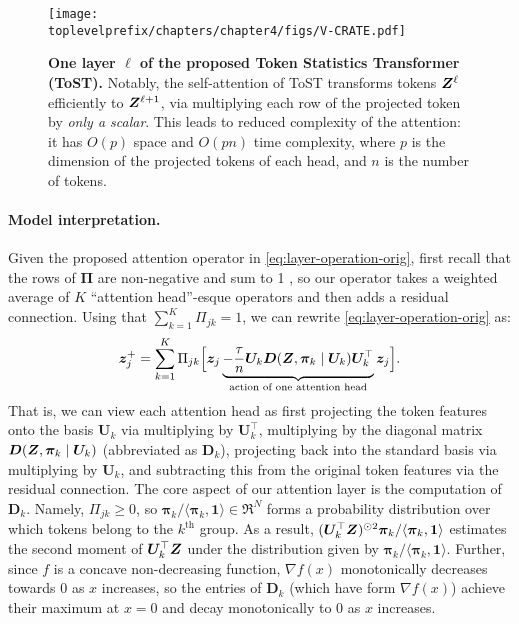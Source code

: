 \documentclass[\toplevelprefix/book-main.tex]{subfiles}
\begin{document}
\begin{figure}[t]
    \centering \texttt{[image: \\toplevelprefix/chapters/chapter4/figs/V-CRATE.pdf]}
    \vspace{-1mm}
    \caption{\small \textbf{One layer $\ell$ of the proposed Token Statistics Transformer (ToST).} Notably, the self-attention of ToST transforms tokens $\bm{Z}^{\ell}$ efficiently to $\bm{Z}^{\ell+1}$, via multiplying each row of the projected token by \textit{only a scalar}. This leads to reduced complexity of the attention: it has $O(p)$ space and $O(pn)$ time complexity, where $p$ is the dimension of the projected tokens of each head, and $n$ is the number of tokens.
    }
    \label{fig:vcrate-architecture}
\end{figure}

\paragraph{Model interpretation.} Given the proposed attention operator in \eqref{eq:layer-operation-orig}, first recall that the rows of $\bm\Pi$ are non-negative and sum to 1
, so our operator takes a weighted average of $K$ ``attention head''-esque operators and then adds a residual connection. Using that \(\sum_{k = 1}^{K}\Pi_{jk} = 1\), we can rewrite \eqref{eq:layer-operation-orig} as: %
\vspace{-2mm}
\begin{equation}
\label{eq:z_up}
    \bm{z}_j^+ = \sum_{k=1}^K \Pi_{jk} \Big[ \bm{z}_j \underbrace{- \frac{\tau}{n} \bm U_{k} \bm D(\bm{Z}, \bm \pi_{k} \mid \bm U_{k}) \bm U_{k}^{\top}}_{\text{action of one attention head}} \bm{z}_j \Big].
\end{equation}
That is, we can view each attention head as first projecting the token features onto the basis $\bm U_{k}$ via multiplying by $\bm U_k^\top$, multiplying by the diagonal matrix $\bm D(\bm{Z}, \bm \pi_{k} \mid \bm U_{k})$ (abbreviated as \(\bm D_{k}\)), projecting back into the standard basis via multiplying by $\bm U_{k}$, and subtracting this from the original token features via the residual connection. The core aspect of our attention layer is the computation of $\bm D_{k}$.  Namely, \(\Pi_{jk} \geq 0\), so $\bm \pi_k / \langle \bm \pi_{k}, \bm 1\rangle \in \Re^N$ forms a probability distribution over which tokens belong to the $k^\text{th}$ group.  As a result, $(\bm U^\top_k \bm{Z})^{\odot 2} \bm \pi_k / \langle \bm \pi_{k}, \bm 1\rangle$ estimates the second moment of $\bm U_k^\top \bm{Z}$ under the distribution given by $\bm \pi_k /  \langle \bm \pi_{k}, \bm 1\rangle$.  Further, since $f$ is a concave non-decreasing function, $\nabla f(x)$ monotonically decreases towards $0$ as $x$ increases, so the entries of $\bm D_{k}$ (which have form $\nabla f(x)$) achieve their maximum at $x=0$ %
and decay monotonically to $0$ as $x$ increases.
\end{document}
